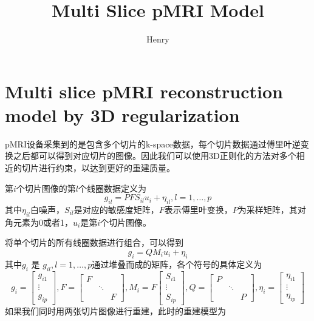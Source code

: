 \documentclass[lang=cn,11pt,a4paper,cite=numbers]{elegantpaper}
\title{Multi Slice pMRI Model}
\author{Henry}
\begin{document}
\maketitle
\section{Multi slice pMRI reconstruction model by 3D regularization} 
\par pMRI设备采集到的是包含多个切片的k-space数据，每个切片数据通过傅里叶逆变换之后都可以得到对应切片的图像。因此我们可以使用3D正则化的方法对多个相近的切片进行约束，以达到更好的重建质量。
\par 第$i$个切片图像的第$l$个线圈数据定义为
\begin{equation}\label{coil}
	g_{il} = PFS_{il}u_i + \eta_{il},l=1,\dots,p
\end{equation}
其中$\eta_{il}$白噪声，$S_{il}$是对应的敏感度矩阵，$F$表示傅里叶变换，$P$为采样矩阵，其对角元素为0或者1，$u_i$是第$i$个切片图像。
\par 将单个切片的所有线圈数据进行组合，可以得到
\begin{equation}
	g_i = QM_i u_i + \eta_i
\end{equation}
其中$g_i$ 是 $g_{il}, l=1,\dots,p$通过堆叠而成的矩阵，各个符号的具体定义为
\begin{equation}
	g_i = \begin{bmatrix}
		g_{i1}\\
		\vdots \\
		g_{ip}
	\end{bmatrix},
	F = \begin{bmatrix}
		F & &\\
		&\ddots &\\
		& & F
	\end{bmatrix},
	M_i = F\begin{bmatrix}
		S_{i1}\\
		\vdots \\
		S_{ip}
	\end{bmatrix},
	Q=\begin{bmatrix}
		P & &\\
		&\ddots &\\
		& & P
	\end{bmatrix},
	\eta_i = \begin{bmatrix}
		\eta_{i1}\\
		\vdots \\
		\eta_{ip}
	\end{bmatrix}
\end{equation}
如果我们同时用两张切片图像进行重建，此时的重建模型为
\end{document}
